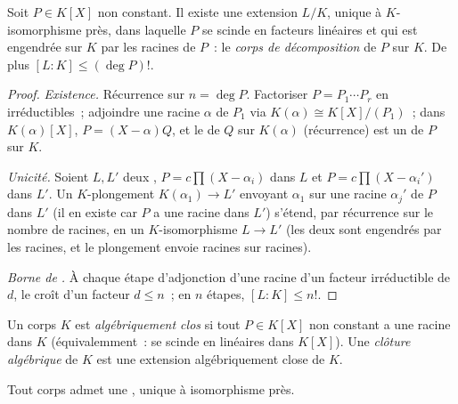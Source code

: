 \begin{theorem}\label{thm:b3:galois:splitting}
Soit $P \in K[X]$ non constant. Il existe une extension $L/K$,
unique à $K$-isomorphisme près, dans laquelle $P$ se scinde en
facteurs linéaires et qui est engendrée sur $K$ par les racines
de $P$~: le \emph{corps de décomposition} de $P$ sur $K$. De plus $[L:K] \leq (\deg P)!$.
\end{theorem}

\begin{proof}
\emph{Existence.} Récurrence sur $n = \deg P$. Factoriser $P =
P_1\cdots P_r$ en irréductibles~; adjoindre une racine $\alpha$
de $P_1$ via $K(\alpha) \cong K[X]/(P_1)$~; dans $K(\alpha)[X]$,
$P = (X - \alpha)Q$, et le  de $Q$ sur
$K(\alpha)$ (récurrence) est un  de $P$ sur
$K$.

\emph{Unicité.} Soient $L, L'$ deux , $P =
c\prod(X - \alpha_i)$ dans $L$ et $P = c\prod(X - \alpha_i')$
dans $L'$. Un $K$-plongement $K(\alpha_1) \to L'$ envoyant
$\alpha_1$ sur une racine $\alpha_j'$ de $P$ dans $L'$ (il en
existe car $P$ a une racine dans $L'$) s'étend, par récurrence
sur le nombre de racines, en un $K$-isomorphisme $L \to L'$
(les deux sont engendrés par les racines, et le plongement envoie
racines sur racines).

\emph{Borne de .} À chaque étape d'adjonction d'une racine
d'un facteur irréductible de  $d$, le  croît d'un
facteur $d \leq n$~; en $n$ étapes, $[L:K] \leq n!$.
\end{proof}

\begin{definition}\label{def:b3:galois:closure}
Un corps $K$ est \emph{algébriquement clos} si tout $P \in K[X]$ non constant a une
racine dans $K$ (équivalemment~: se scinde en linéaires dans
$K[X]$). Une \emph{clôture algébrique}
de $K$ est une extension  algébriquement close de $K$.
\end{definition}

\begin{theorem}[Steinitz]\label{thm:b3:galois:steinitz}
Tout corps admet une , unique à isomorphisme
près.
\end{theorem}

